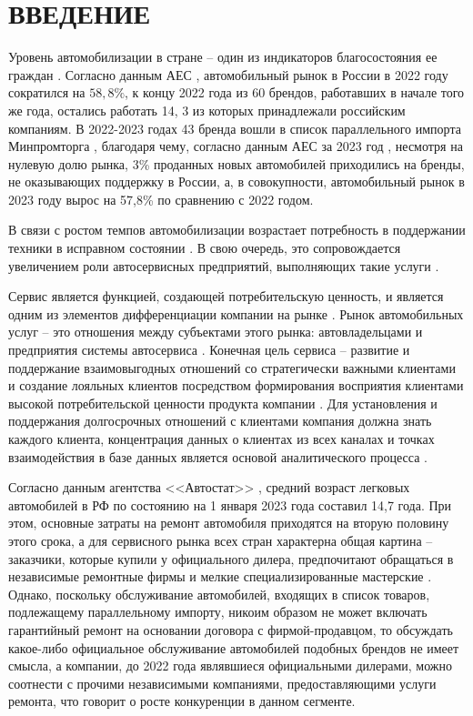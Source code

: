 \chapter*{ВВЕДЕНИЕ}

Уровень автомобилизации в стране -- один из индикаторов благосостояния ее граждан \cite{diler}. 
Согласно данным АЕС \cite{stat2022aebrus}, автомобильный рынок в России в 2022 году сократился на $58,8\%$, к концу 2022 года из 60 брендов, работавших в начале того же года, остались работать 14, 3 из которых принадлежали российским компаниям. 
В 2022-2023 годах 43 бренда вошли в список параллельного импорта Минпромторга \cite{parallelimport}, благодаря чему, согласно данным АЕС за 2023 год \cite{stat2023aebrus}, несмотря на нулевую долю рынка, 3\% проданных новых автомобилей приходились на бренды, не оказывающих поддержку в России, а, в совокупности, автомобильный рынок в 2023 году вырос на 57,8\% по сравнению с 2022 годом. 

В связи с ростом темпов автомобилизации возрастает потребность в поддержании техники в исправном состоянии \cite{diler}. 
В свою очередь, это сопровождается увеличением роли автосервисных предприятий, выполняющих такие услуги \cite{diler}.
 
Сервис является функцией, создающей потребительскую ценность, и является одним из элементов дифференциации компании на рынке \cite{upravavto}. 
Рынок автомобильных услуг -- это отношения между субъектами этого рынка: автовладельцами и предприятия системы автосервиса \cite{upravavto}.
Конечная цель сервиса -- развитие и поддержание взаимовыгодных отношений со стратегически важными клиентами и создание лояльных клиентов посредством формирования восприятия клиентами высокой потребительской ценности продукта компании \cite{upravavto}. 
Для установления и поддержания долгосрочных отношений с клиентами компания должна знать каждого клиента, концентрация данных о клиентах из всех каналах и точках взаимодействия в базе данных является основой аналитического процесса \cite{upravavto}. 

Согласно данным агентства <<Автостат>> \cite{yearold}, средний возраст легковых автомобилей в РФ по состоянию на 1 января 2023 года составил 14,7 года. 
При этом, основные затраты на ремонт автомобиля приходятся на вторую половину этого срока, а для сервисного рынка всех стран характерна общая картина -- заказчики, которые купили у официального дилера, предпочитают обращаться в независимые ремонтные фирмы и мелкие специализированные мастерские \cite{volgin}. 
Однако, поскольку обслуживание автомобилей, входящих в список товаров, подлежащему параллельному импорту, никоим образом не может включать гарантийный ремонт на основании договора с фирмой-продавцом, то обсуждать какое-либо официальное обслуживание автомобилей подобных брендов не имеет смысла, а компании, до 2022 года являвшиеся официальными дилерами, можно соотнести с прочими независимыми компаниями, предоставляющими услуги ремонта, что говорит о росте конкуренции в данном сегменте. 

